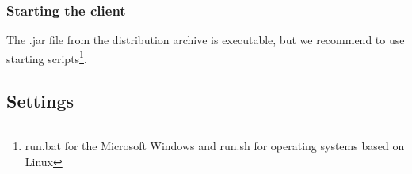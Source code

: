 \documentclass[12pt,a4paper]{report}
\begin{document}
\subsubsection{Starting the client}

The .jar file from the distribution archive is executable, but we recommend to use starting scripts\footnote{run.bat for the Microsoft Windows and run.sh for operating systems based on Linux}.

\subsection{Settings}
\end{document}
